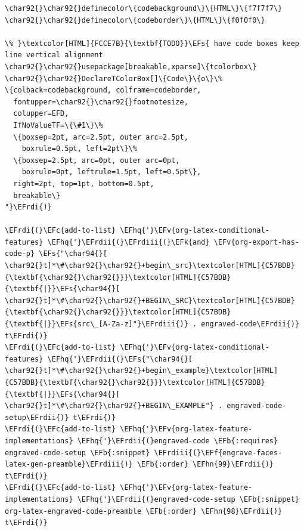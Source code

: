 \documentclass{scrartcl}
\newcommand{\EFk}[1]{\textcolor{EFk}{#1}} %
\newcommand{\EFs}[1]{\textcolor{EFs}{#1}} %
\newcommand{\EFb}[1]{\textcolor{EFb}{#1}} %
\newcommand{\EFc}[1]{\textcolor{EFc}{#1}} %
\newcommand{\EFv}[1]{\textcolor{EFv}{#1}} %
\newcommand{\EFf}[1]{\textcolor{EFf}{#1}} %
\newcommand{\EFhn}[1]{#1} %
\newcommand{\EFhq}[1]{#1} %
\newcommand{\EFrdi}[1]{#1} %
\newcommand{\EFrdii}[1]{#1} %
\newcommand{\EFrdiii}[1]{#1} %
\begin{document}
\begin{Code}
\begin{Verbatim}[]
\char92{}\char92{}definecolor\{codebackground\}\{HTML\}\{f7f7f7\}
\char92{}\char92{}definecolor\{codeborder\}\{HTML\}\{f0f0f0\}

\% }\textcolor[HTML]{FCCE7B}{\textbf{TODO}}\EFs{ have code boxes keep line vertical alignment
\char92{}\char92{}usepackage[breakable,xparse]\{tcolorbox\}
\char92{}\char92{}DeclareTColorBox[]\{Code\}\{o\}\%
\{colback=codebackground, colframe=codeborder,
  fontupper=\char92{}\char92{}footnotesize,
  colupper=EFD,
  IfNoValueTF=\{\#1\}\%
  \{boxsep=2pt, arc=2.5pt, outer arc=2.5pt,
    boxrule=0.5pt, left=2pt\}\%
  \{boxsep=2.5pt, arc=0pt, outer arc=0pt,
    boxrule=0pt, leftrule=1.5pt, left=0.5pt\},
  right=2pt, top=1pt, bottom=0.5pt,
  breakable\}
"}\EFrdi{)}

\EFrdi{(}\EFc{add-to-list} \EFhq{'}\EFv{org-latex-conditional-features} \EFhq{'}\EFrdii{(}\EFrdiii{(}\EFk{and} \EFv{org-export-has-code-p} \EFs{"\char94{}[ \char92{}t]*\#\char92{}\char92{}+begin\_src}\textcolor[HTML]{C57BDB}{\textbf{\char92{}\char92{}}}\textcolor[HTML]{C57BDB}{\textbf{|}}\EFs{\char94{}[ \char92{}t]*\#\char92{}\char92{}+BEGIN\_SRC}\textcolor[HTML]{C57BDB}{\textbf{\char92{}\char92{}}}\textcolor[HTML]{C57BDB}{\textbf{|}}\EFs{src\_[A-Za-z]"}\EFrdiii{)} . engraved-code\EFrdii{)} t\EFrdi{)}
\EFrdi{(}\EFc{add-to-list} \EFhq{'}\EFv{org-latex-conditional-features} \EFhq{'}\EFrdii{(}\EFs{"\char94{}[ \char92{}t]*\#\char92{}\char92{}+begin\_example}\textcolor[HTML]{C57BDB}{\textbf{\char92{}\char92{}}}\textcolor[HTML]{C57BDB}{\textbf{|}}\EFs{\char94{}[ \char92{}t]*\#\char92{}\char92{}+BEGIN\_EXAMPLE"} . engraved-code-setup\EFrdii{)} t\EFrdi{)}
\EFrdi{(}\EFc{add-to-list} \EFhq{'}\EFv{org-latex-feature-implementations} \EFhq{'}\EFrdii{(}engraved-code \EFb{:requires} engraved-code-setup \EFb{:snippet} \EFrdiii{(}\EFf{engrave-faces-latex-gen-preamble}\EFrdiii{)} \EFb{:order} \EFhn{99}\EFrdii{)} t\EFrdi{)}
\EFrdi{(}\EFc{add-to-list} \EFhq{'}\EFv{org-latex-feature-implementations} \EFhq{'}\EFrdii{(}engraved-code-setup \EFb{:snippet} org-latex-engraved-code-preamble \EFb{:order} \EFhn{98}\EFrdii{)} t\EFrdi{)}


\end{Verbatim}
\end{Code}
\end{document}
